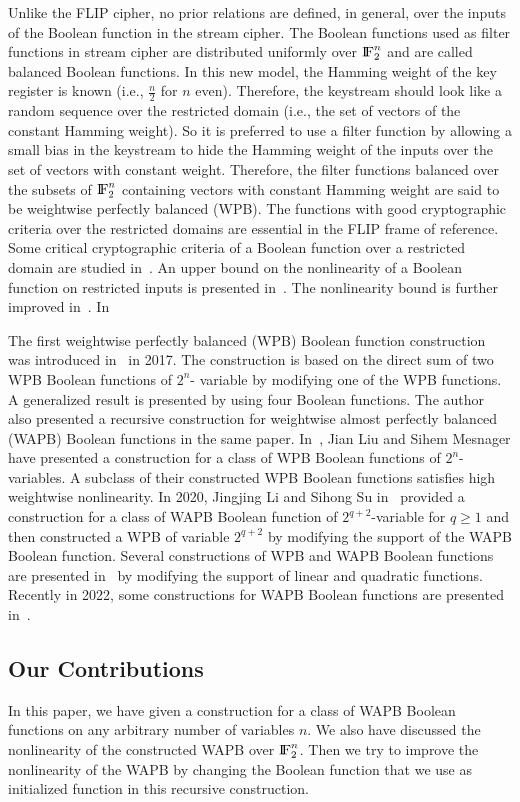 \documentclass{article}[12pt]
\newcommand{\FF}{{\rm I\!F}}
\newcommand{\red}{\color{red}}
\begin{document}
Unlike the FLIP cipher, no prior relations are defined, in general, over the inputs of the Boolean function in the stream cipher. The Boolean functions used as filter functions in stream cipher are distributed uniformly over $\FF_2^n$ and are called balanced Boolean functions. In this new model, the Hamming weight of the key register is known (i.e., $\frac{n}{2}$ for $n$ even). Therefore, the keystream should look like a random sequence over the restricted domain (i.e., the set of vectors of the constant Hamming weight).
{\red So it is preferred to use a filter function by allowing a small bias in the keystream to hide the Hamming weight of the inputs over the set of vectors with constant weight.}
Therefore, the filter functions balanced over the subsets of $\FF_2^n$ containing vectors with constant Hamming weight are said to be weightwise perfectly balanced (WPB). The functions with good cryptographic criteria over the restricted domains are essential in the FLIP frame of reference. Some critical cryptographic criteria of a Boolean function over a restricted domain are studied in~\cite{CMR17}. An upper bound on the nonlinearity of a Boolean function on restricted inputs is presented in~\cite{CMR17}. The nonlinearity bound is further improved in~\cite{MZD19}. {\red In~\cite{MMMRS20}}

The first weightwise perfectly balanced (WPB) Boolean function construction was introduced in~\cite{CMR17} in 2017. The construction is based on the direct sum of two WPB Boolean functions of $2^{n}$- variable by modifying one of the WPB functions. A generalized result is presented by using four Boolean functions. The author also presented a recursive construction for weightwise almost perfectly balanced (WAPB) Boolean functions in the same paper. In~\cite{LM19}, Jian Liu and Sihem Mesnager have presented a construction for a class of WPB Boolean functions of $2^{n}$-variables. A subclass of their constructed WPB Boolean functions satisfies high weightwise nonlinearity. In 2020, Jingjing Li and Sihong Su in~\cite{LS20} provided a construction for a class of WAPB Boolean function of $2^{q+2}$-variable for $q \geq 1$ and then constructed a WPB of variable $2^{q+2}$ by modifying the support of the WAPB Boolean function. Several constructions of WPB and WAPB Boolean functions are presented in~\cite{MS21} by modifying the support of linear and quadratic functions. Recently in 2022, some constructions for WAPB Boolean functions are presented in~\cite{ZS22, GS22}.
\subsection{Our Contributions}\label{ssec:cont}
In this paper, we have given a construction for a class of WAPB Boolean functions on any arbitrary number of variables $n$. We also have discussed the nonlinearity of the constructed WAPB over $\FF_2^n$. Then we try to improve the nonlinearity of the WAPB by changing the Boolean function that we use as initialized function in this recursive construction.
\end{document}
